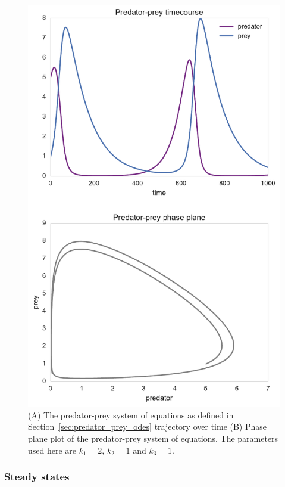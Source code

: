 \begin{figure}[htb]
\centerfloat
    \includegraphics[scale=0.7]{../../chapters/chapterBackgr/images/pp-phaseplane.pdf}
    \caption[Phase plane analysis]{(A) The predator-prey system of equations as defined in Section~\ref{sec:predator_prey_odes} trajectory over time (B) Phase plane plot of the predator-prey system of equations. The parameters used here are $k_1=2$, $k_2=1$ and $k_3=1$.}
    \label{fig:pp_phase}
\end{figure}

\subsubsection{Steady states}

